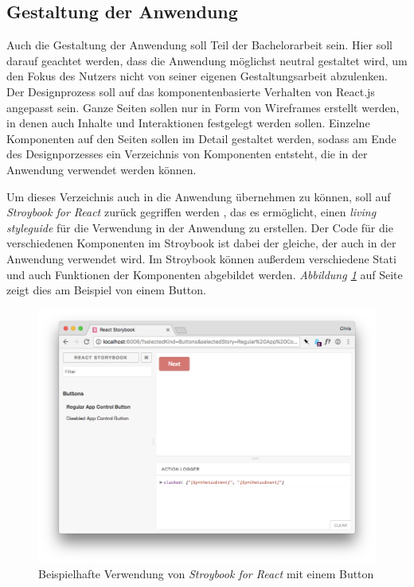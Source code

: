 \subsection{Gestaltung der Anwendung}
Auch die Gestaltung der Anwendung soll Teil der Bachelorarbeit sein. Hier soll darauf geachtet werden, dass die Anwendung möglichst neutral gestaltet wird, um den Fokus des Nutzers nicht von seiner eigenen Gestaltungsarbeit abzulenken.\\
Der Designprozess soll auf das komponentenbasierte Verhalten von React.js angepasst sein. Ganze Seiten sollen  nur in Form von Wireframes erstellt werden, in denen auch Inhalte und Interaktionen festgelegt werden sollen. Einzelne Komponenten auf den Seiten sollen im Detail gestaltet werden, sodass am Ende des Designporzesses ein Verzeichnis von Komponenten entsteht, die in der Anwendung verwendet werden können.

Um dieses Verzeichnis auch in die Anwendung übernehmen zu können, soll auf \textit{Stroybook for React} zurück gegriffen werden \cite{StorybooksOnline}, das es ermöglicht, einen \textit{living styleguide} für die Verwendung in der Anwendung zu erstellen. Der Code für die verschiedenen Komponenten im Stroybook ist dabei der gleiche, der auch in der Anwendung verwendet wird. Im Stroybook können außerdem verschiedene Stati und auch Funktionen der Komponenten abgebildet werden. \textit{Abbildung \ref{fig:storybook}} auf Seite \pageref{fig:storybook} zeigt dies am Beispiel von einem Button.

\begin{figure}[h]
  \centering
  \includegraphics[width=1\textwidth]{images/ReactStroybooksExample.png}
  \caption{Beispielhafte Verwendung von \textit{Stroybook for React} mit einem Button}
  \label{fig:storybook}
\end{figure}

